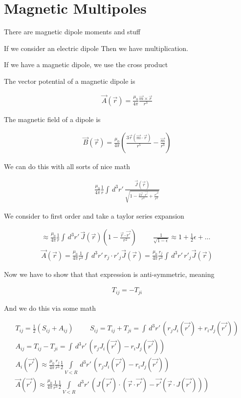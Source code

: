 \documentclass[fleqn]{report}
\newcommand{\hp}{\hspace{1cm}}
\newcommand{\equations} [1] {
\begin{gather*}
#1
\end{gather*}
}
\begin{document}
\section{Magnetic Multipoles}
There are magnetic dipole moments and stuff 

If we consider an electric dipole 
Then we have multiplication. 

If we have a magnetic dipole, we use the cross product 

The vector potential of a magnetic dipole is 
\equations{
    \vec A(\vec r) = 
    \frac{\mu_0}{4 \pi} 
    \frac{\vec m \times \vec r}{r^3}
}

The magnetic field of a dipole is 
\equations{
    \vec B(\vec r) = \frac{\mu_0}{4 \pi}
    \left(
        \frac{3 \vec r(\vec m \cdot \vec r)}{r^5}
        -
        \frac{\vec m}{r^3}
    \right)
}

We can do this with all sorts of nice math 

\equations{
    \frac{\mu_0}{4 \pi}
    \frac{1}{r}
    \int \, d^3 r' \, 
    \frac{\vec J(\vec r)}
    {\sqrt{1 - \frac{2 \vec r \cdot \vec{r'}}{r^2} + \frac{{r'}^2}{r^2}}}
}

We consider to first order 
and take a taylor series expansion 

\equations{
    \approx
    \frac{\mu_0}{4 \pi}
    \frac{1}{r}
    \int \, d^3 r' \, 
    \vec J(\vec r)
    \left(
        1
        -
        \frac{\vec r \cdot \vec{r'}}{r^2}
    \right)
    \hp
    \frac{1}{\sqrt{1 - \epsilon}}
    \approx 
    1 + \frac{1}{2} \epsilon + \ldots
    \\
    \vec A(\vec r)
    =
    \frac{\mu_0}{4 \pi}
    \frac{1}{r^3}
    \int \, d^3 r' \, 
    r_j \cdot r'_j
    \vec J(\vec r)
    =
    \frac{\mu_0}{4 \pi}
    \frac{r_j}{r^3}
    \int \, d^3 r' \, 
    r'_j
    \vec J(\vec r)
}

Now we have to show that that expression is anti-symmetric, meaning 
\equations{
    T_{ij} = - T_{ji}
}

And we do this via some math 
\equations{
    T_{ij} = \frac{1}{2} 
    \left(
        S_{ij} + A_{ij}
    \right)
    \hp 
    S_{ij}
    =
    T_{ij} + T_{ji} 
    =
    \int \, d^3 r' \, 
    \left(
        r_j J_i(\vec{r'}) + r_i J_j(\vec{r'}) 
    \right)
    \\
    A_{ij}
    =
    T_{ij} - T_{ji}
    =
    \int \, d^3 r' \, 
    \left(
        r_j J_i(\vec{r'}) - r_i J_j(\vec{r'}) 
    \right)
    \\
    A_i(\vec{r'})
    \approx 
    \frac{\mu_0}{4 \pi}
    \frac{r_j}{r^3}
    \frac{1}{2}
    \int\limits_{V < R} \, d^3 r' \, 
    \left(
        r_j J_i(\vec{r'}) - r_i J_j(\vec{r'}) 
    \right)
    \\
    \vec A(\vec{r'})
    \approx 
    \frac{\mu_0}{4 \pi}
    \frac{1}{r^3}
    \frac{1}{2}
    \int\limits_{V < R} \, d^3 r' \, 
    \left(
        J(\vec{r'}) \cdot (\vec r \cdot \vec{r'}) 
        - 
        \vec{r'} (\vec r \cdot J(\vec{r'}))
    \right)
}
\end{document}
